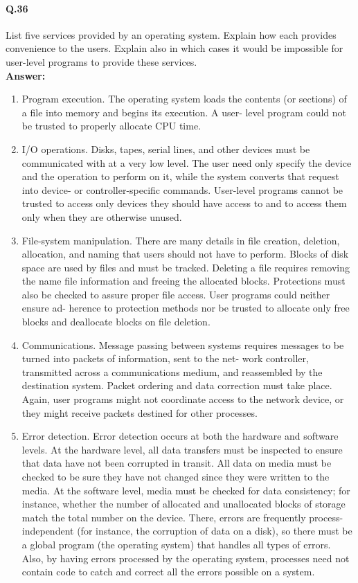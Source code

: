 \documentclass[a4paper,10pt]{article}
\begin{document}
\paragraph{Q.36}
List five services provided by an operating system. Explain how each
provides convenience to the users. Explain also in which cases it would
be impossible for user-level programs to provide these services.\\
\textbf{Answer:}
\begin{enumerate}
   \item  Program execution. The operating system loads the contents (or
sections) of a file into memory and begins its execution. A user-
level program could not be trusted to properly allocate CPU time.

\item I/O operations. Disks, tapes, serial lines, and other devices must
be communicated with at a very low level. The user need only
specify the device and the operation to perform on it, while the
system converts that request into device- or controller-specific
commands. User-level programs cannot be trusted to access only
devices they should have access to and to access them only when
they are otherwise unused.

\item File-system manipulation. There are many details in file creation,
deletion, allocation, and naming that users should not have to perform.
Blocks of disk space are used by files and must be tracked.
Deleting a file requires removing the name file information and
freeing the allocated blocks. Protections must also be checked to
assure proper file access. User programs could neither ensure ad-
herence to protection methods nor be trusted to allocate only free
blocks and deallocate blocks on file deletion.

\item Communications. Message passing between systems requires
messages to be turned into packets of information, sent to the net-
work controller, transmitted across a communications medium,
and reassembled by the destination system. Packet ordering and
data correction must take place. Again, user programs might not
coordinate access to the network device, or they might receive
packets destined for other processes.

\item Error detection. Error detection occurs at both the hardware and
software levels. At the hardware level, all data transfers must be
inspected to ensure that data have not been corrupted in transit.
All data on media must be checked to be sure they have not
changed since they were written to the media. At the software
level, media must be checked for data consistency; for instance,
whether the number of allocated and unallocated blocks of storage
match the total number on the device. There, errors are frequently
process-independent (for instance, the corruption of data on a
disk), so there must be a global program (the operating system)
that handles all types of errors. Also, by having errors processed
by the operating system, processes need not contain code to catch
and correct all the errors possible on a system.

\end{enumerate}
\end{document}
